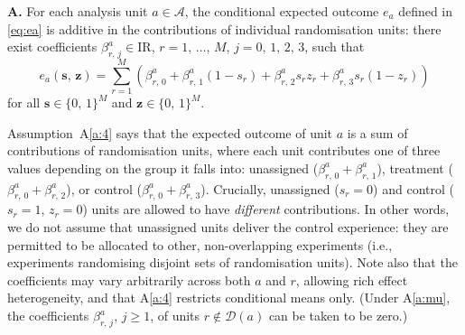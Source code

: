 \documentclass[sigconf,nonacm]{acmart}
\newcounter{assumption}
\newenvironment{assumption}{\refstepcounter{assumption}\par\medskip\noindent\textbf{A\theassumption.}\enspace}{\par\medskip}
\newcommand{\R}{\mathrm{I}\!\mathrm{R}}
\begin{document}
\begin{assumption}\label{a:4}
For each analysis unit $a\in\mathcal{A}$, the conditional expected outcome $e_a$ defined in \eqref{eq:ea} is additive in the contributions of individual randomisation units: there exist coefficients $\beta^a_{r,\,j}\in\R$, $r=1,\,\ldots,\,M$, $j=0,\,1,\,2,\,3$, such that
\begin{equation*}
    e_a(\textbf{s},\,\textbf{z}) = \sum_{r=1}^M\left(\beta^a_{r,\,0}+\beta^a_{r,\,1}(1-s_r)+\beta^a_{r,\,2}s_rz_r+\beta^a_{r,\,3}s_r(1-z_r)\right)
\end{equation*}
for all $\textbf{s}\in\{0,\,1\}^M$ and $\textbf{z}\in\{0,\,1\}^M$.
\end{assumption}
Assumption~A\ref{a:4} says that the expected outcome of unit $a$ is a sum of contributions of randomisation units, where each unit contributes one of three values depending on the group it falls into: unassigned ($\beta^a_{r,\,0}+\beta^a_{r,\,1}$), treatment ($\beta^a_{r,\,0}+\beta^a_{r,\,2}$), or control ($\beta^a_{r,\,0}+\beta^a_{r,\,3}$). Crucially, unassigned ($s_r=0$) and control ($s_r=1$, $z_r=0$) units are allowed to have \emph{different} contributions. In other words, we do not assume that unassigned units deliver the control experience: they are permitted to be allocated to other, non-overlapping experiments (i.e., experiments randomising disjoint sets of randomisation units). Note also that the coefficients may vary arbitrarily across both $a$ and $r$, allowing rich effect heterogeneity, and that A\ref{a:4} restricts conditional means only. (Under A\ref{a:mu}, the coefficients $\beta^a_{r,\,j}$, $j\ge 1$, of units $r\notin\mathcal D(a)$ can be taken to be zero.)
\end{document}

